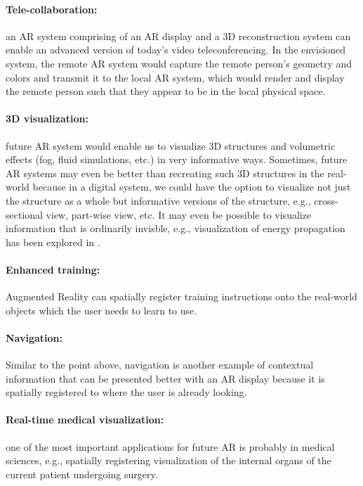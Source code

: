 \paragraph{Tele-collaboration:} an AR system comprising of an AR display and a 3D reconstruction system can enable an advanced version of today’s video teleconferencing. 
In the envisioned system, the remote AR system would capture the remote person’s geometry and colors and transmit it to the local AR system, which would render and display the remote person such that they appear to be in the local physical space.
\paragraph{3D visualization:} future AR system would enable us to visualize 3D structures and volumetric effects (fog, fluid simulations, etc.) in very informative ways. 
Sometimes, future AR systems may even be better than recreating such 3D structures in the real-world because in a digital system, we could have the option to visualize not just the structure as a whole but informative versions of the structure, e.g., cross-sectional view, part-wise view, etc. 
It may even be possible to visualize information that is ordinarily invisble, e.g., visualization of energy propagation has been explored in \citet{lanier2016realitymashers,lanier2018virtually}. 
\paragraph{Enhanced training:} Augmented Reality can spatially register training instructions onto the real-world objects which the user needs to learn to use. 
\paragraph{Navigation:} Similar to the point above, navigation is another example of contextual information that can be presented better with an AR display because it is spatially registered to where the user is already looking.
\paragraph{Real-time medical visualization:} one of the most important applications for future AR is probably in medical sciences, e.g., spatially registering visualization of the internal organs of the current patient undergoing surgery.


